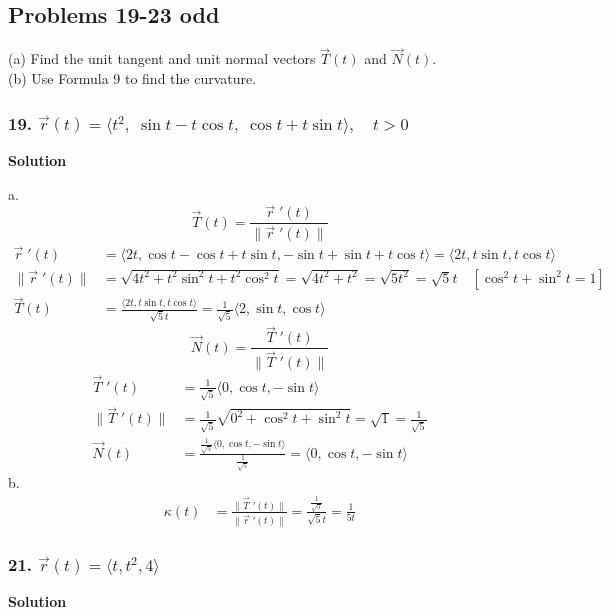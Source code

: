 \documentclass{article}
\newcommand{\drvec}{\vec{r}\;'(t)}
\begin{document}
\subsection*{Problems 19-23 odd}

(a) Find the unit tangent and unit normal vectors $\vec{T}(t)$ and $\vec{N}(t)$. \\
(b) Use Formula 9 to find the curvature.


\subsubsection*{19. $\vec{r}(t) = \langle{t^2,\; \sin{t} - t\cos{t},\; \cos{t} + t\sin{t}} \rangle, \quad t > 0$}
\centerline{\textbf{Solution}}
a. 
\[
    \vec{T}(t) = \frac{\drvec}{\|\drvec\|}   
\]
\begin{align*}
    \drvec &= \langle 2t, \cos t - \cos t + t\sin t, -\sin t + \sin t + t\cos t \rangle = \langle 2t, t\sin t, t\cos t \rangle \\
    \|\drvec\| &= \sqrt{4t^2 + t^2\sin^2t + t^2\cos^2t} = \sqrt{4t^2 + t^2} = \sqrt{5t^2} = \sqrt{5}t \quad [\cos^2t + \sin^2t = 1] \\ 
    \vec{T}(t) &= \frac{\langle 2t, t\sin t, t\cos t \rangle}{\sqrt{5}t} = \frac{1}{\sqrt{5}}\langle 2, \sin t, \cos t \rangle
\end{align*}
\[
    \vec{N}(t) = \frac{\vec{T}\;'(t)}{\|\vec{T}\;'(t)\|}
\]
\begin{align*}
    \vec{T}\;'(t) &= \frac{1}{\sqrt{5}}\langle 0, \cos t, -\sin t \rangle \\
    \|\vec{T}\;'(t)\| &= \frac {1}{\sqrt 5} \sqrt{0^2 + \cos^2t + \sin^2t} = \sqrt{1} = \frac{1}{\sqrt 5} \\
    \vec{N}(t) &= \frac{ \frac{1}{\sqrt{5}} \langle 0, \cos t, -\sin t \rangle}{\frac{1}{\sqrt{5}}} = \langle 0, \cos t, -\sin t \rangle 
\end{align*}
b. 
\begin{align*}
    \kappa(t) &= \frac{\|\vec{T}\;'(t)\|}{\|\drvec\|} = \frac{\frac{1}{\sqrt 5}}{\sqrt 5t} = \frac{1}{5t}
\end{align*}

\subsubsection*{21. $\vec{r}(t) = \langle{t, t^2, 4} \rangle$}
\centerline{\textbf{Solution}}
\end{document}
